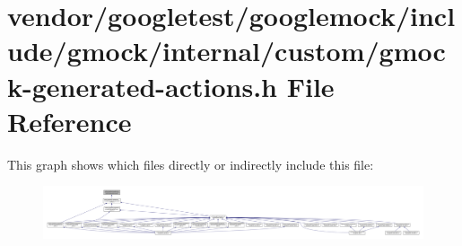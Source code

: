 \hypertarget{internal_2custom_2gmock-generated-actions_8h}{}\section{vendor/googletest/googlemock/include/gmock/internal/custom/gmock-\/generated-\/actions.h File Reference}
\label{internal_2custom_2gmock-generated-actions_8h}
This graph shows which files directly or indirectly include this file\+:\nopagebreak
\begin{figure}[H]
\begin{center}
\leavevmode
\includegraphics[width=350pt]{internal_2custom_2gmock-generated-actions_8h__dep__incl}
\end{center}
\end{figure}
